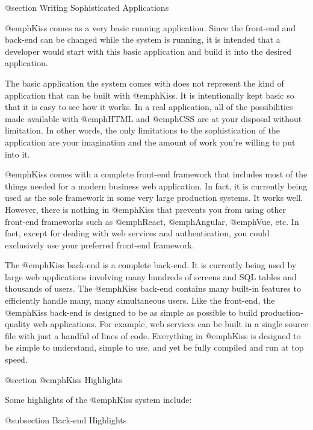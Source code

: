 @section Writing Sophisticated Applications

@emph{Kiss} comes as a very basic running application. Since the
front-end and back-end can be changed while the system is running, it
is intended that a developer would start with this basic application
and build it into the desired application.

The basic application the system comes with does not represent the
kind of application that can be built with @emph{Kiss}. It is
intentionally kept basic so that it is easy to see how it works.  In a
real application, all of the possibilities made available with
@emph{HTML} and @emph{CSS} are at your disposal without limitation. In
other words, the only limitations to the sophistication of the
application are your imagination and the amount of work you're willing
to put into it.

@emph{Kiss} comes with a complete front-end framework that includes
most of the things needed for a modern business web application. In
fact, it is currently being used as the sole framework in some very
large production systems.  It works well. However, there is nothing in
@emph{Kiss} that prevents you from using other front-end frameworks such as
@emph{React}, @emph{Angular}, @emph{Vue}, etc. In fact, except for
dealing with web services and authentication, you could exclusively
use your preferred front-end framework.

The @emph{Kiss} back-end is a complete back-end. It is currently
being used by large web applications involving many hundreds of
screens and SQL tables and thousands of users. The @emph{Kiss}
back-end contains many built-in features to efficiently handle many,
many simultaneous users. Like the front-end, the @emph{Kiss} back-end
is designed to be as simple as possible to build production-quality
web applications. For example, web services can be built in a single
source file with just a handful of lines of code. Everything in
@emph{Kiss} is designed to be simple to understand, simple to use, and
yet be fully compiled and run at top speed.

@section @emph{Kiss} Highlights

Some highlights of the @emph{Kiss} system include:

@subsection Back-end Highlights

